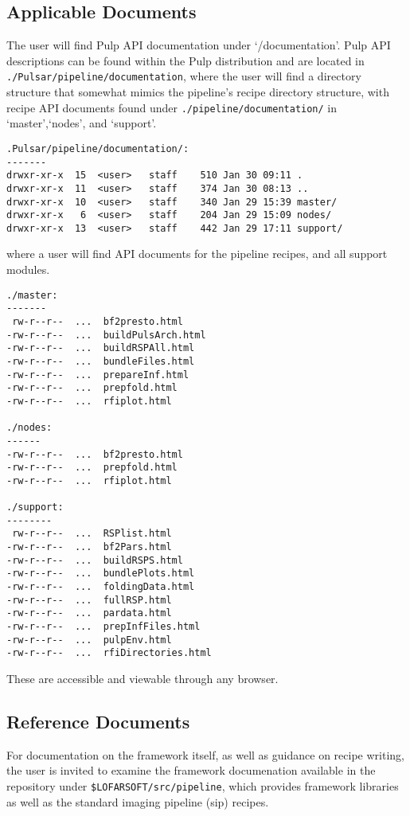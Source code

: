\documentclass[a4paper,10pt,bibtotoc]{scrartcl}
\begin{document}
\subsection{Applicable Documents}
The user will find Pulp API documentation under `/documentation'.
Pulp API descriptions can be found within the Pulp distribution and are located
in \verb|./Pulsar/pipeline/documentation|, where the user will find a directory
structure that somewhat mimics the pipeline's recipe  directory structure,
with recipe API documents found under \verb|./pipeline/documentation/|
in `master',`nodes', and `support'.
\begin{verbatim}
.Pulsar/pipeline/documentation/:
-------
drwxr-xr-x  15  <user>   staff    510 Jan 30 09:11 .
drwxr-xr-x  11  <user>   staff    374 Jan 30 08:13 ..
drwxr-xr-x  10  <user>   staff    340 Jan 29 15:39 master/
drwxr-xr-x   6  <user>   staff    204 Jan 29 15:09 nodes/
drwxr-xr-x  13  <user>   staff    442 Jan 29 17:11 support/
\end{verbatim}
where a user will find API documents for the pipeline recipes, and all support
modules.\\
\begin{verbatim}
./master:
-------
 rw-r--r--  ...  bf2presto.html
-rw-r--r--  ...  buildPulsArch.html
-rw-r--r--  ...  buildRSPAll.html
-rw-r--r--  ...  bundleFiles.html
-rw-r--r--  ...  prepareInf.html
-rw-r--r--  ...  prepfold.html
-rw-r--r--  ...  rfiplot.html

./nodes:
------
-rw-r--r--  ...  bf2presto.html
-rw-r--r--  ...  prepfold.html
-rw-r--r--  ...  rfiplot.html

./support:
--------
 rw-r--r--  ...  RSPlist.html
-rw-r--r--  ...  bf2Pars.html
-rw-r--r--  ...  buildRSPS.html
-rw-r--r--  ...  bundlePlots.html
-rw-r--r--  ...  foldingData.html
-rw-r--r--  ...  fullRSP.html
-rw-r--r--  ...  pardata.html
-rw-r--r--  ...  prepInfFiles.html
-rw-r--r--  ...  pulpEnv.html
-rw-r--r--  ...  rfiDirectories.html
\end{verbatim}
These are accessible and viewable through any browser.

\subsection{Reference Documents}
For documentation on the framework itself, as well as guidance on recipe writing,
the user is invited to examine the framework documenation available in the 
repository under \verb|$LOFARSOFT/src/pipeline|, which provides framework
libraries as well as the standard imaging pipeline (sip) recipes.
\end{document}
